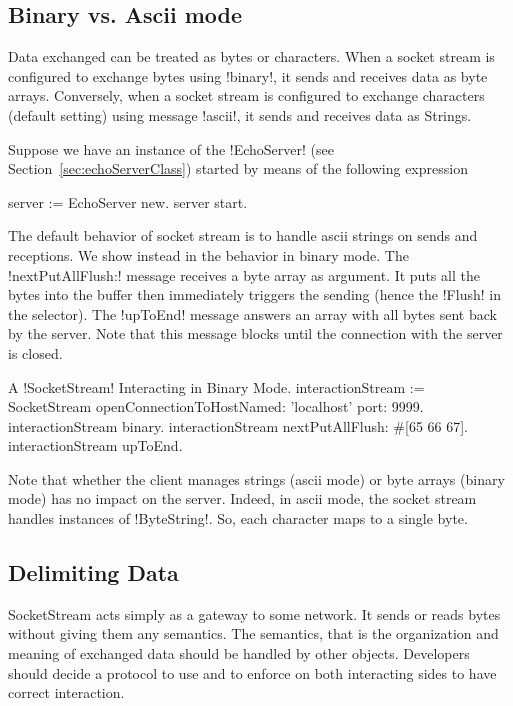 \documentclass[a4paper,10pt,twoside]{book}
\begin{document}
\subsection{Binary vs. Ascii mode}
Data exchanged can be treated as bytes or characters. When a socket stream is configured to exchange bytes using \ct!binary!, it sends and receives data as byte arrays.
Conversely, when a socket stream is configured to exchange characters (default setting) using message \ct!ascii!, it sends and receives data as Strings.

Suppose we have an instance of the \ct!EchoServer! (see Section~\ref{sec:echoServerClass}) started by means of the following expression
\begin{code}{}
server := EchoServer new.
server start.
\end{code}

The default behavior of socket stream is to handle ascii strings on sends and receptions.
We show instead in  the behavior in binary mode.
The \ct!nextPutAllFlush:! message receives a byte array as argument.
It puts all the bytes into the buffer then immediately triggers the sending (hence the \ct!Flush! in the selector).
The \ct!upToEnd! message answers an array with all bytes sent back by the server.
Note that this message blocks until the connection with the server is closed.


\begin{script}{A \ct!SocketStream! Interacting in Binary Mode.}
interactionStream := SocketStream 
									openConnectionToHostNamed: 'localhost' port: 9999.  
interactionStream binary.
interactionStream nextPutAllFlush: #[65 66 67].
interactionStream upToEnd.
\end{script}

Note that whether the client manages strings (ascii mode) or byte arrays (binary mode) has no impact on the server.
Indeed, in ascii mode, the socket stream handles instances of \ct!ByteString!.
So, each character maps to a single byte. 

\subsection{Delimiting Data}
SocketStream acts simply as a gateway to some network. 
It sends or reads bytes without giving them any semantics.
The semantics, that is the organization and meaning of exchanged data should be handled by other objects.
Developers should decide a protocol to use and to enforce on both interacting sides to have correct interaction.
\end{document}
